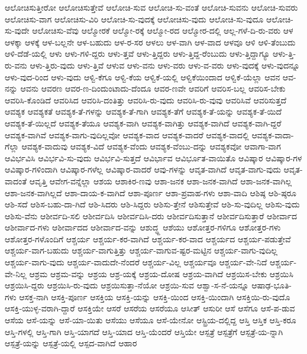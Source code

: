 {ಆಲೋಚಿಸುತ್ತೀರೋ
ಆಲೋಚಿಸುತ್ತೇವೆ
ಆಲೋಚಿ-ಸುವ
ಆಲೋಚಿ-ಸು-ವಂತೆ
ಆಲೋಚಿ-ಸುವನು
ಆಲೋಚಿ-ಸುವರು
ಆಲೋಚಿಸು-ವಾಗ
ಆಲೋಚಿಸು-ವಿರಿ
ಆಲೋಚಿ-ಸು-ವುದಕ್ಕೆ
ಆಲೋಚಿಸು-ವುದು
ಆಲೋಚಿ-ಸು-ವುದೂ
ಆಲೋಚಿ-ಸು-ವುದೇ
ಆಲೋಚಿಸು-ವೆವು
ಆಲ್ಮೋರಕೆ
ಆಲ್ಮೋ-ರಕ್ಕೆ
ಆಲ್ಮೋ-ರದ
ಆಲ್ಮೋರ-ದಲ್ಲಿ
ಆಲ್ಲ-ಗಳೆ-ದಿ-ರು-ವರು
ಆಳ
ಆಳಕ್ಕಾ
ಆಳಕ್ಕೆ
ಆಳ-ಬಲ್ಲನೇ
ಆಳ-ಬಹುದು
ಆಳ-ರ-ಸರ
ಆಳಲು
ಆಳ-ವಾಗಿ
ಆಳ-ವಾದ
ಆಳವೂ
ಆಳಿ
ಆಳಿ-ತೆಂಬುದು
ಆಳಿ-ದೆಡೆ-ಯಲ್ಲಿ
ಆಳು
ಆಳು-ಗಳಿ-ದ್ದರು
ಆಳು-ತ್ತವೆ
ಆಳು-ತ್ತಿದ್ದರು
ಆಳು-ತ್ತಿದ್ದ-ರೆಂಬುದು
ಆಳು-ತ್ತಿದ್ದಾಗ್ಯೂ
ಆಳು-ತ್ತಿ-ರು-ವನು
ಆಳು-ತ್ತಿರು-ವುದು
ಆಳು-ತ್ತಿವೆ
ಆಳುವ
ಆಳು-ವನು
ಆಳು-ವರು
ಆಳು-ವ-ವರು
ಆಳು-ವುದಕ್ಕೆ
ಆಳು-ವುದನ್ನೂ
ಆಳು-ವುದ-ರಿಂದ
ಆಳು-ವುದು
ಆಳ್ವಿ-ಕೆಗೂ
ಆಳ್ವಿ-ಕೆಯ
ಆಳ್ವಿಕೆ-ಯಲ್ಲಿ
ಆಳ್ವಿಕೆಯಿಂದಾದ
ಆಳ್ವಿಕೆ-ಯೆಲ್ಲಾ
ಆವನ
ಆವ-ನನ್ನು
ಆವನು
ಆವರಣ
ಆವರ-ಣ-ದಿಂದುಂಟಾದು-ದೆಂದೂ
ಆವರ-ಣವೇ
ಆವರಿಗೆ
ಆವರಿಸ-ಬಲ್ಲ
ಆವರಿಸ-ಬೇಕು
ಆವರಿಸಿ-ಕೊಂಡಿದೆ
ಆವರಿಸಿದ
ಆವರಿಸಿ-ದಂತಿತ್ತು
ಆವರಿಸಿ-ರು-ವುದು
ಆವರಿಸಿ-ರು-ವುವು
ಆವರಿಸಿವೆ
ಆವರಿಸುತ್ತದೆ
ಆವಶ್ಯಕ
ಆವಶ್ಯಕತೆ
ಆವಶ್ಯಕ-ತೆ-ಗಳನ್ನು
ಆವಶ್ಯಕ-ತೆ-ಗಾಗಿ
ಆವಶ್ಯಕ-ತೆಗೆ
ಆವಶ್ಯಕ-ತೆ-ಯನ್ನು
ಆವಶ್ಯಕ-ತೆ-ಯಿದೆ
ಆವಶ್ಯಕ-ತೆ-ಯಿಲ್ಲದೆ
ಆವಶ್ಯಕ-ತೆಯೂ
ಆವಶ್ಯಕ-ವಾಗಿ
ಆವಶ್ಯಕ-ವಾಗಿತ್ತು
ಆವಶ್ಯಕ-ವಾಗಿದೆ
ಆವಶ್ಯಕ-ವಾಗಿ-ದ್ದರೆ
ಆವಶ್ಯಕ-ವಾಗಿವೆ
ಆವಶ್ಯಕ-ವಾಗು-ವುದಿಲ್ಲವೋ
ಆವಶ್ಯಕ-ವಾದ
ಆವಶ್ಯಕ-ವಾದರೆ
ಆವಶ್ಯಕ-ವಾದಲ್ಲಿ
ಆವಶ್ಯಕ-ವಾದಾ-ಗೆಲ್ಲಾ
ಆವಶ್ಯಕ-ವಾದುವು
ಆವಶ್ಯಕ-ವಿದೆ
ಆವಶ್ಯಕ-ವೆಂದು
ಆವಶ್ಯಕ-ವೆಂಬು-ದನ್ನು
ಆವಶ್ಯಕವೋ
ಆವಾಗಾ-ವಾಗ
ಆವಿರ್ಭವಿಸಿ
ಆವಿರ್ಭವಿ-ಸು-ವುದು
ಆವಿರ್ಭವಿ-ಸುತ್ತದೆ
ಆವಿರ್ಭಾವ
ಆವಿರ್ಭೂತ-ವಾಯಿತೊ
ಆವಿಷ್ಕಾರ
ಆವಿಷ್ಕಾರ-ಗಳ
ಆವಿಷ್ಕಾರ-ಗಳಿಂದಾಗಿ
ಆವಿಷ್ಕಾರ-ಗಳೆಲ್ಲ
ಆವಿಷ್ಕಾರ-ವಾದರೆ
ಆವು-ಗಳನ್ನು
ಆವೃತ-ವಾಗಿದೆ
ಆವೃತ-ವಾಗು-ವುದು
ಆವೃತ-ವಾದಂತೆ
ಆವೃತ್ತಿ
ಆವೇಗ-ವನ್ನೆಲ್ಲಾ
ಆಶಯ
ಆಶಾಕಿರ-ಣವು
ಆಶಾ-ಜನಕ
ಆಶಾ-ಜನಕ-ವಾಗಿದೆ
ಆಶಾ-ಜನಕ-ವಾಗಿಲ್ಲ
ಆಶಾ-ಜನಕ-ವಾಗಿಲ್ಲದೆ
ಆಶಾ-ದಾಯ-ಕ-ವಾಗಿದೆ
ಆಶಾ-ಪೂರ್ಣ
ಆಶಾ-ಪ್ರವಾಹ-ಗಳು
ಆಶಾ-ವಾದಿ
ಆಶಿಷ್ಠ
ಆಶಿ-ಷ್ಠರೂ
ಆಶಿ-ಸದೆ
ಆಶಿಸ-ಬಹು-ದಾ-ಗಿದೆ
ಆಶಿ-ಸಿದರು
ಆಶಿ-ಸಿದ್ದರು
ಆಶಿಸು-ತ್ತೇನೆ
ಆಶಿಸುತ್ತೇವೆ
ಆಶಿ-ಸು-ವುದಿಲ್ಲ
ಆಶಿಸು-ವುದು
ಆಶಿಸು-ವೆನು
ಆಶೀರ್ವದಿ-ಸಲಿ
ಆಶೀರ್ವದಿಸಿ
ಆಶೀರ್ವದಿಸಿ-ದರು
ಆಶೀರ್ವದಿಸುತ್ತಾನೆ
ಆಶೀರ್ವದಿಸುತ್ತಾರೆ
ಆಶೀರ್ವಾದ
ಆಶೀರ್ವಾದ-ಗಳು
ಆಶೀರ್ವಾದದ
ಆಶೀರ್ವಾದ-ವನ್ನು
ಆಶುದ್ಧ್ದ
ಆಶೆಯು
ಆಶೋತ್ತರ-ಗಳಿಗೂ
ಆಶೋತ್ತರ-ಗಳು
ಆಶೋತ್ತರ-ಗಳೊಂದಿಗೆ
ಆಶ್ಚರ್ಯ
ಆಶ್ಚರ್ಯ-ಕರ-ವಾಗಿದೆ
ಆಶ್ಚರ್ಯ-ಕರ-ವಾದ
ಆಶ್ಚರ್ಯದ
ಆಶ್ಚರ್ಯ-ಪಡುತ್ತೇವೆ
ಆಶ್ಚರ್ಯ-ವಾಗ-ಬಹುದು
ಆಶ್ಚರ್ಯ-ವಾಗುತ್ತಿತ್ತು
ಆಶ್ಚರ್ಯ-ವಾಗುವ-ಷ್ಟರ-ಮಟ್ಟಿನ
ಆಶ್ಚರ್ಯ-ವಾಗು-ವುದಿಲ್ಲ
ಆಶ್ಚರ್ಯ-ವಾಗು-ವುದು
ಆಶ್ಚರ್ಯ-ವಾದುದೇ-ನೆಂದರೆ
ಆಶ್ಚರ್ಯ-ವಿಲ್ಲ
ಆಶ್ಚರ್ಯವೂ
ಆಶ್ಚರ್ಯ-ವೇ-ನಿದೆ
ಆಶ್ಚರ್ಯ-ವೇ-ನಿಲ್ಲ
ಆಶ್ರಮ
ಆಶ್ರಮ-ವನ್ನು
ಆಶ್ರಯ
ಆಶ್ರ-ಯಕ್ಕೆ
ಆಶ್ರಯ-ದೋಷ
ಆಶ್ರಯ-ವಾಗಿದೆ
ಆಶ್ರಯಿಸ-ಬೇಕು
ಆಶ್ರಯಿಸಿ
ಆಶ್ರಯಿಸಿ-ದ್ದರು
ಆಶ್ರಯಿಸಿ-ರು-ವುದು
ಆಶ್ರಯಿಸುತ್ತಾ-ನೆಯೋ
ಆಶ್ರಯಿ-ಸುವ
ಆಶ್ವಾ-ಸ-ನೆ-ಯನ್ನೂ
ಆಷಾಢ-ಭೂತಿ-ಗಳು
ಆಸಕ್ತ-ನಾಗಿ
ಆಸಕ್ತಿ-ಪೂರ್ಣ
ಆಸಕ್ತಿಯ
ಆಸಕ್ತಿ-ಯನ್ನು
ಆಸಕ್ತಿ-ಯಿಂದ
ಆಸಕ್ತಿ-ಯಿಂದಾಗಿ
ಆಸಕ್ತಿಯಿ-ರು-ವುದೊ
ಆಸಕ್ತಿ-ಯುಳ್ಳ-ವರಾಗಿ-ದ್ದಾರೆ
ಆಸಕ್ತಿಯೇ
ಆಸರೆ
ಆಸರೆಯ
ಆಸರೆಯೂ
ಆಸೀತ್
ಆಸುರೀ
ಆಸೆ
ಆಸೆಗೂ
ಆಸೆ-ಪ-ಡುವ
ಆಸೆಯ
ಆಸೆ-ಯನ್ನು
ಆಸೆ-ಯಾ-ಯಿತು
ಆಸೆಯು
ಆಸೆಯೂ
ಆಸೆ-ಯೇನೋ
ಆಸ್ಟ್ರಿಯ-ದಲ್ಲಿದ್ದ
ಆಸ್ತಿ
ಆಸ್ತಿಕ
ಆಸ್ತಿ-ಕರೂ
ಆಸ್ತಿ-ಗಳಲ್ಲಿ
ಆಸ್ತಿ-ಗಾಗಿ
ಆಸ್ತಿ-ಯಾಗದೆ
ಆಸ್ತಿ-ಯಾದ
ಆಸ್ತಿ-ಯೆಂದರೆ
ಆಸ್ತಿಯೇ
ಆಸ್ಪತ್ರೆ
ಆಸ್ಪತ್ರೆಗೆ
ಆಸ್ಪತ್ರೆ-ಯ-ನ್ನಾಗಿ
ಆಸ್ಪತ್ರೆ-ಯನ್ನು
ಆಸ್ಪತ್ರೆ-ಯಲ್ಲಿ
ಆಸ್ಪದ-ವಾಗಿದೆ
ಆಹಾರ
}
